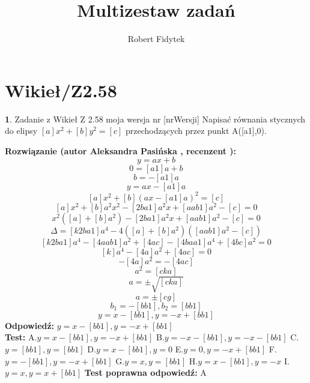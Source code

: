 \documentclass[12pt, a4paper]{article}
\title{Multizestaw zadań}
\author{Robert Fidytek}
\date{}
\theoremstyle{definition} %
\newtheorem{zad}{}
\newcommand{\kategoria}[1]{\section{#1}} %
\newcommand{\zadStart}[1]{\begin{zad}#1\newline} %
\newcommand{\zadStop}{\end{zad}}   %
\newcommand{\rozwStart}[2]{\noindent \textbf{Rozwiązanie (autor #1 , recenzent #2): }\newline} %
\newcommand{\rozwStop}{\newline}                                            %
\newcommand{\odpStart}{\noindent \textbf{Odpowiedź:}\newline}    %
\newcommand{\odpStop}{\newline}                                             %
\newcommand{\testStart}{\noindent \textbf{Test:}\newline} %
\newcommand{\testStop}{\newline} %
\newcommand{\kluczStart}{\noindent \textbf{Test poprawna odpowiedź:}\newline} %
\newcommand{\kluczStop}{\newline} %
\begin{document}
\maketitle


\kategoria{Wikieł/Z2.58}
\zadStart{Zadanie z Wikieł Z 2.58 moja wersja nr [nrWersji]}
Napisać równania stycznych do elipsy $[a]x^2+[b]y^2=[c]$ przechodzących przez punkt A([a1],0).
\zadStop
\rozwStart{Aleksandra Pasińska}{}
$$y=ax+b$$
$$0=[a1]a+b$$
$$b=-[a1]a$$
$$y=ax-[a1]a$$
$$[a]x^2+[b](ax-[a1]a)^2=[c]$$
$$[a]x^2+[b]a^2x^2-[2ba1]a^2x+[aab1]a^2-[c]=0$$
$$x^2([a]+[b]a^2)-[2ba1]a^2x+[aab1]a^2-[c]=0$$
$$\Delta=[k2ba1]a^4-4([a]+[b]a^2)([aab1]a^2-[c])$$
$$[k2ba1]a^4-[4aab1]a^2+[4ac]-[4baa1]a^4+[4bc]a^2=0$$
$$[k]a^4-[4a]a^2+[4ac]=0$$
$$-[4a]a^2=-[4ac]$$
$$a^2=[cka]$$
$$a=\pm \sqrt{[cka]}$$
$$a=\pm [cg]$$
$$b_1=-[bb1],b_2=[bb1]$$
$$ y=x-[bb1], y=-x+[bb1]$$
\rozwStop
\odpStart
$ y=x-[bb1], y=-x+[bb1]$\\
\odpStop
\testStart
A.$ y=x-[bb1], y=-x+[bb1]$
B.$ y=-x-[bb1], y=-x-[bb1]$
C.$ y=[bb1], y=[bb1]$
D.$ y=x-[bb1], y=0$
E.$ y=0, y=-x+[bb1]$
F.$ y=-[bb1], y=-x+[bb1]$
G.$ y=x, y=[bb1]$
H.$ y=x-[bb1], y=-x$
I.$ y=x, y=x+[bb1]$
\testStop
\kluczStart
A
\kluczStop
\end{document}
